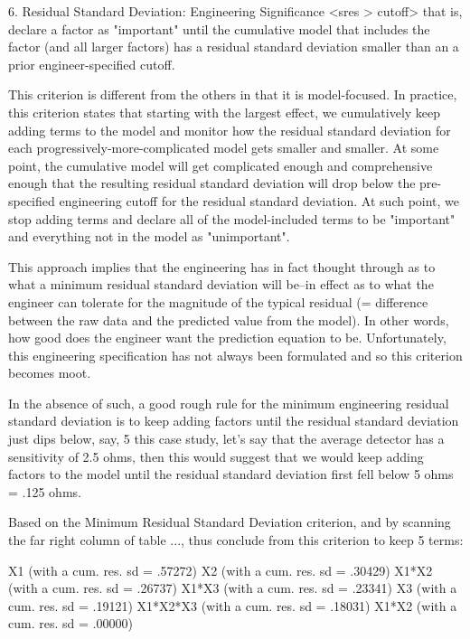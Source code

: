 6. Residual Standard Deviation: Engineering Significance
   <sres > cutoff>
   that is, declare a factor as "important" until the
   cumulative model that includes the factor (and
   all larger factors) has a residual standard
   deviation smaller than an a prior
   engineer-specified cutoff.

   This criterion is different from the others in
   that it is model-focused.  In practice, this
   criterion states that starting with the largest
   effect, we cumulatively keep adding terms to
   the model and monitor how the residual standard
   deviation for each
   progressively-more-complicated model gets
   smaller and smaller.  At some point, the
   cumulative model will get complicated enough
   and comprehensive enough that the resulting
   residual standard deviation will drop below the
   pre-specified engineering cutoff for the
   residual standard deviation.  At such point, we
   stop adding terms and declare all of the
   model-included terms to be "important" and
   everything not in the model as "unimportant".

   This approach implies that the engineering has
   in fact thought through as to what a minimum
   residual standard deviation will be--in effect
   as to what the engineer can tolerate for the
   magnitude of the typical residual (= difference
   between the raw data and the predicted value
   from the model).  In other words, how good does
   the engineer want the prediction equation to
   be.  Unfortunately, this engineering
   specification has not always been formulated
   and so this criterion becomes moot.

   In the absence of such, a good rough rule for
   the minimum engineering residual standard
   deviation is to keep adding factors until the
   residual standard deviation just dips below,
   say, 5%
   this case study, let's say that the average
   detector has a sensitivity of 2.5 ohms, then
   this would suggest that we would keep adding
   factors to the model until the residual
   standard deviation first fell below 5%
   ohms = .125 ohms.

   Based on the Minimum Residual Standard
   Deviation criterion, and by scanning the far
   right column of table ..., thus conclude from
   this criterion to keep 5 terms:

      X1       (with a cum. res. sd = .57272)
      X2       (with a cum. res. sd = .30429)
      X1*X2    (with a cum. res. sd = .26737)
      X1*X3    (with a cum. res. sd = .23341)
      X3       (with a cum. res. sd = .19121)
      X1*X2*X3 (with a cum. res. sd = .18031)
      X1*X2    (with a cum. res. sd = .00000)

